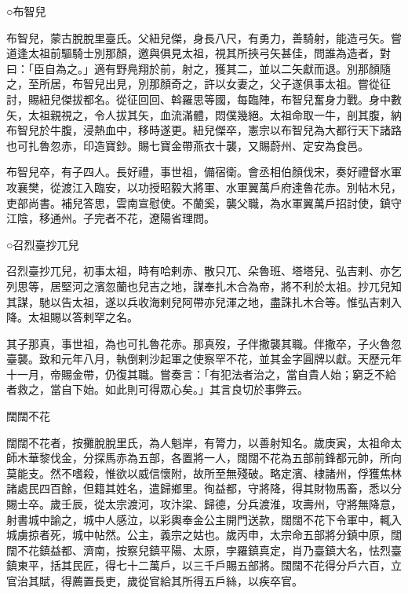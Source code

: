 
\begin{pinyinscope}

 ○布智兒



 布智兒，蒙古脫脫里臺氏。父紐兒傑，身長八尺，有勇力，善騎射，能造弓矢。嘗道逢太祖前驅騎士別那顏，邀與俱見太祖，視其所挾弓矢甚佳，問誰為造者，對曰：「臣自為之。」適有野鳧翔於前，射之，獲其二，並以二矢獻而退。別那顏隨之，至所居，布智兒出見，別那顏奇之，許以女妻之，父子遂俱事太祖。嘗從征討，賜紐兒傑拔都名。從征回回、斡羅思等國，每臨陣，布智兒奮身力戰。身中數矢，太祖親視之，令人拔其矢，血流滿體，悶僕幾絕。太祖命取一牛，剖其腹，納布智兒於牛腹，浸熱血中，移時遂更。紐兒傑卒，憲宗以布智兒為大都行天下諸路也可扎魯忽赤，印造寶鈔。賜七寶金帶燕衣十襲，又賜蔚州、定安為食邑。



 布智兒卒，有子四人。長好禮，事世祖，備宿衛。會丞相伯顏伐宋，奏好禮督水軍攻襄樊，從渡江入臨安，以功授昭毅大將軍、水軍翼萬戶府達魯花赤。別帖木兒，吏部尚書。補兒答思，雲南宣慰使。不蘭奚，襲父職，為水軍翼萬戶招討使，鎮守江陰，移通州。子完者不花，遼陽省理問。



 ○召烈臺抄兀兒



 召烈臺抄兀兒，初事太祖，時有哈剌赤、散只兀、朵魯班、塔塔兒、弘吉剌、亦乞列思等，居堅河之濱忽蘭也兒吉之地，謀奉扎木合為帝，將不利於太祖。抄兀兒知其謀，馳以告太祖，遂以兵收海剌兒阿帶亦兒渾之地，盡誅扎木合等。惟弘吉剌入降。太祖賜以答剌罕之名。



 其子那真，事世祖，為也可扎魯花赤。那真歿，子伴撒襲其職。伴撒卒，子火魯忽臺襲。致和元年八月，執倒剌沙起軍之使察罕不花，並其金字圓牌以獻。天歷元年十一月，帝賜金帶，仍復其職。嘗奏言：「有犯法者治之，當自貴人始；窮乏不給者救之，當自下始。如此則可得眾心矣。」其言良切於事弊云。



 闊闊不花



 闊闊不花者，按攤脫脫里氏，為人魁岸，有膂力，以善射知名。歲庚寅，太祖命太師木華黎伐金，分探馬赤為五部，各置將一人，闊闊不花為五部前鋒都元帥，所向莫能支。然不嗜殺，惟欲以威信懷附，故所至無殘破。略定濱、棣諸州，俘獲焦林諸處民四百餘，但籍其姓名，遣歸鄉里。徇益都，守將降，得其財物馬畜，悉以分賜士卒。歲壬辰，從太宗渡河，攻汴梁、歸德，分兵渡淮，攻壽州，守將無降意，射書城中諭之，城中人感泣，以彩輿奉金公主開門送款，闊闊不花下令軍中，輒入城虜掠者死，城中帖然。公主，義宗之姑也。歲丙申，太宗命五部將分鎮中原，闊闊不花鎮益都、濟南，按察兒鎮平陽、太原，孛羅鎮真定，肖乃臺鎮大名，怯烈臺鎮東平，括其民匠，得七十二萬戶，以三千戶賜五部將。闊闊不花得分戶六百，立官治其賦，得薦置長吏，歲從官給其所得五戶絲，以疾卒官。




\end{pinyinscope}

